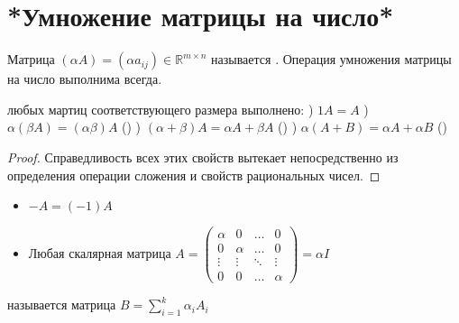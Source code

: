 \section{*Умножение матрицы на число*}
\begin{opred}
Матрица $(\alpha{}A)=\left( \alpha{}a_{ij} \right) \in \mathbb {R}^{m\times{}n}$ называется . Операция умножения матрицы на число выполнима всегда.
\end{opred}
\begin{theor}
 любых мартиц соответствующего размера выполнено:
) $1A=A$
) $\alpha(\beta{}A)=(\alpha{}\beta)A$ ()
) $(\alpha+\beta)A=\alpha{}A+\beta{}A$ ()
) $\alpha(A+B)=\alpha{}A+\alpha{}B$ ()
\end{theor}
\begin{proof}
Справедливость всех этих свойств вытекает непосредственно из определения операции сложения и свойств рациональных чисел.
\end{proof}
\begin{itemize}
\item $-A=(-1)A$
\item Любая скалярная матрица
$
A=\begin{pmatrix}
\alpha & 0       & \ldots & 0      \\
0       & \alpha & \ldots & 0      \\
\vdots  & \vdots  & \ddots & \vdots \\
0       & 0       & \ldots & \alpha
\end{pmatrix}=\alpha{}I
$
\end{itemize}
\begin{opred}
 называется матрица $B=\sum\limits_{i=1}^k\alpha_iA_i$
\end{opred}
